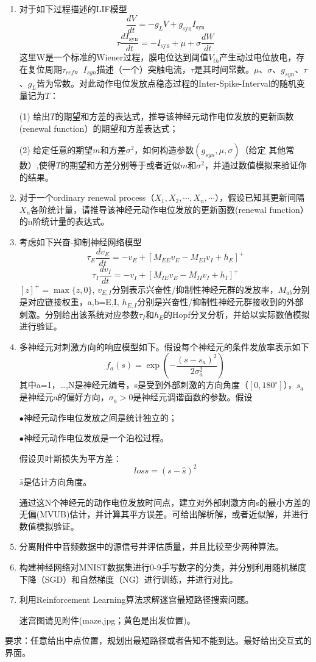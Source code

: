 \documentclass[UTF8,a4paper]{ctexart}
\begin{document}
\begin{enumerate}
\item 对于如下过程描述的LIF模型
\[
\frac{dV}{dt}=-g_LV+g_{\mathrm{syn}}I_{\mathrm{syn}}
\]
\[
\tau\frac{dI_{\mathrm{syn}}}{dt}=-I_{\mathrm{syn}}+\mu+\sigma\frac{dW}{dt}
\]
这里W是一个标准的Wiener过程，膜电位达到阈值$V_{th}$产生动过电位放电，存在复位周期$\tau_{ref}$。$I_{syn}$描述（一个）突触电流，$\tau$是其时间常数。$\mu$、$\sigma$、$g_{syn}$、$\tau$、$g_L$皆为常数。对此动作电位发放点稳态过程的Inter-Spike-Interval的随机变量记为$T$：
\par (1) 给出$T$的期望和方差的表达式，推导该神经元动作电位发放的更新函数(renewal function）的期望和方差表达式；
\par (2) 给定任意的期望$m$和方差$\sigma^2$，如何构造参数$(g_{syn},\mu,\sigma)$（给定
\newpage
其他常数）,使得$T$的期望和方差分别等于或者近似$m$和$\sigma^2$，并通过数值模拟来验证你的结果。

\item 对于一个ordinary renewal process（$X_1,X_2,\cdots,X_n,\cdots$），假设已知其更新间隔$X_n$各阶统计量，请推导该神经元动作电位发放的更新函数(renewal function）的n阶统计量的表达式。

\item 考虑如下兴奋-抑制神经网络模型
\[
\tau_E\frac{dv_E}{dt}=-v_E+\left[M_{EE}v_E-M_{EI}v_I+h_E\right]^+
\]
\[
\tau_I\frac{dv_I}{dt}=-v_I+\left[M_{IE}v_E-M_{II}v_I+h_I\right]^+
\]
$[z]^+=\max\{z,0\}$, $v_{E,I}$分别表示兴奋性/抑制性神经元群的发放率，$M_{ab}$分别是对应链接权重，a,b=E,I, $h_{E,I}$分别是兴奋性/抑制性神经元群接收到的外部刺激。分别给出该系统对应参数$\tau_I$和$h_E$的Hopf分叉分析，并给以实际数值模拟进行验证。

\item 多神经元对刺激方向的响应模型如下。假设每个神经元的条件发放率表示如下
\[
f_a(s)=\exp\left(-\frac{(s-s_a)^2}{2\sigma_a^2}\right)
\]
其中a=1，…,N是神经元编号，s是受到外部刺激的方向角度（$[0,180^\circ]$），$s_a$是神经元a的偏好方向，$\sigma_a>0$是神经元调谐函数的参数。假设
\newpage
\par {\Large$\bullet$}\quad 神经元动作电位发放之间是统计独立的；
\par {\Large$\bullet$}\quad 神经元动作电位发放是一个泊松过程。
\par 假设贝叶斯损失为平方差：
\[
loss=(s-\hat{s})^2
\]
$\hat{s}$是估计方向角度。

通过这N个神经元的动作电位发放时间点，建立对外部刺激方向s的最小方差的无偏(MVUB)估计，并计算其平方误差。可给出解析解，或者近似解，并进行数值模拟验证。

\item 分离附件中音频数据中的源信号并评估质量，并且比较至少两种算法。

\item 构建神经网络对MNIST数据集进行0-9手写数字的分类，并分别利用随机梯度下降（SGD）和自然梯度（NG）进行训练，并进行对比。

\item 利用Reinforcement Learning算法求解迷宫最短路径搜索问题。\par 迷宫图请见附件(maze.jpg；黄色是出发位置)。
\end{enumerate}

要求：任意给出中点位置，规划出最短路径或者告知不能到达。最好给出交互式的界面。
\end{document}
